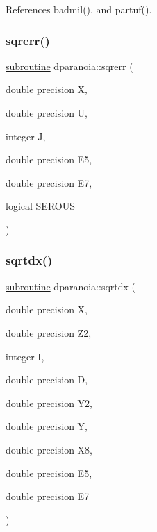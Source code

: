 References badmil(), and partuf().

\mbox{\label{dparanoia_8f90_a0c8227a6d55d254aa7917dc70462539e}} 
\subsubsection{\texorpdfstring{sqrerr()}{sqrerr()}}
{\footnotesize\ttfamily \hyperlink{M__stopwatch_83_8txt_acfbcff50169d691ff02d4a123ed70482}{subroutine} dparanoia\+::sqrerr (\begin{DoxyParamCaption}\item[{double precision}]{X,  }\item[{double precision}]{U,  }\item[{integer}]{J,  }\item[{double precision}]{E5,  }\item[{double precision}]{E7,  }\item[{logical}]{S\+E\+R\+O\+US }\end{DoxyParamCaption})}

\mbox{\label{dparanoia_8f90_ac8baf7c673c51ef12f8668ada0ca5a1d}} 
\subsubsection{\texorpdfstring{sqrtdx()}{sqrtdx()}}
{\footnotesize\ttfamily \hyperlink{M__stopwatch_83_8txt_acfbcff50169d691ff02d4a123ed70482}{subroutine} dparanoia\+::sqrtdx (\begin{DoxyParamCaption}\item[{double precision}]{X,  }\item[{double precision}]{Z2,  }\item[{integer}]{I,  }\item[{double precision}]{D,  }\item[{double precision}]{Y2,  }\item[{double precision}]{Y,  }\item[{double precision}]{X8,  }\item[{double precision}]{E5,  }\item[{double precision}]{E7 }\end{DoxyParamCaption})}

